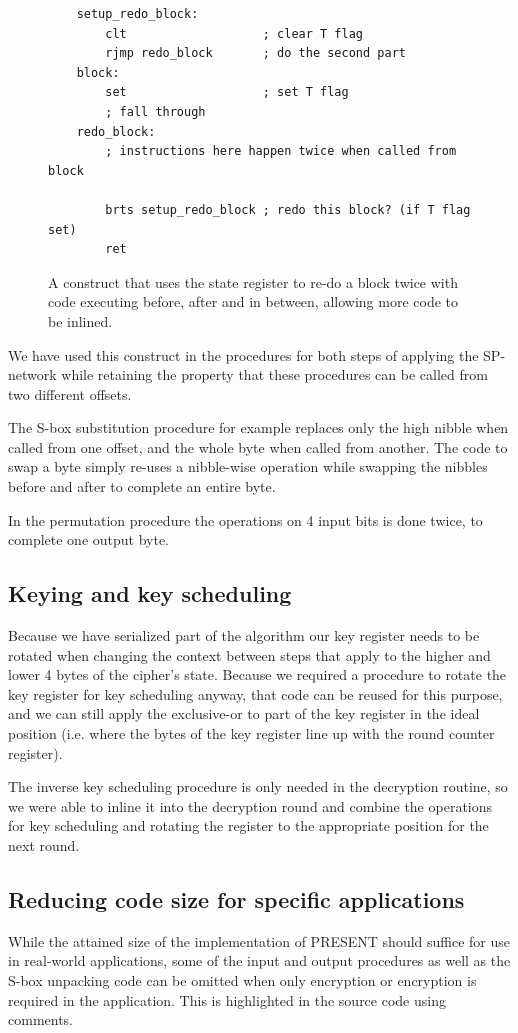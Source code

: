 \documentclass{llncs}
\begin{document}
\begin{figure}
	\begin{lstlisting}
	setup_redo_block:
		clt                   ; clear T flag
		rjmp redo_block       ; do the second part
	block:
		set                   ; set T flag
		; fall through
	redo_block:
		; instructions here happen twice when called from block

		brts setup_redo_block ; redo this block? (if T flag set)
		ret
	\end{lstlisting}
	\caption{A construct that uses the state register to re-do a block twice with code executing before, after and in between, allowing more code to be inlined.}
\label{sreg_redo}
\end{figure}

We have used this construct in the procedures for both steps of applying the SP-network while retaining the property that these procedures can be called from two different offsets.

The S-box substitution procedure for example replaces only the high nibble when called from one offset, and the whole byte when called from another.
The code to swap a byte simply re-uses a nibble-wise operation while swapping the nibbles before and after to complete an entire byte.

In the permutation procedure the operations on 4 input bits is done twice, to complete one output byte.

\subsection{Keying and key scheduling}
Because we have serialized part of the algorithm our key register needs to be rotated when changing the context between steps that apply to the higher and lower 4 bytes of the cipher's state.
Because we required a procedure to rotate the key register for key scheduling anyway, that code can be reused for this purpose, and we can still apply the exclusive-or to part of the key register in the ideal position (i.e. where the bytes of the key register line up with the round counter register).

The inverse key scheduling procedure is only needed in the decryption routine, so we were able to inline it into the decryption round and combine the operations for key scheduling and rotating the register to the appropriate position for the next round.

\subsection{Reducing code size for specific applications}
While the attained size of the implementation of PRESENT should suffice for use in real-world applications, some of the input and output procedures as well as the S-box unpacking code can be omitted when only encryption or encryption is required in the application.
This is highlighted in the source code using comments.
\end{document}
